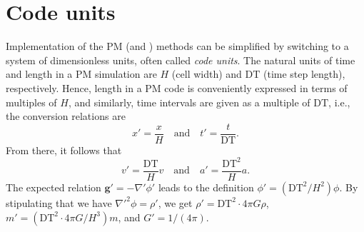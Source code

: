 \section{Code units}
Implementation of the PM (and \PThreeM{}) methods can be simplified by switching to a system of dimensionless units, often called \textit{code units}.
The natural units of time and length in a PM simulation are $H$ (cell width) and $\textrm{DT}$ (time step length), respectively.
Hence, length in a PM code is conveniently expressed in terms of multiples of $H$, and similarly, time intervals are given as a multiple of $\textrm{DT}$, i.e., the conversion relations are
\begin{equation*}
    x' = \frac{x}{H} \quad \text{and} \quad t' = \frac{t}{\textrm{DT}}.
\end{equation*}
From there, it follows that
\begin{equation*}
    v' = \frac{\textrm{DT}}{H}v \quad \text{and} \quad a' = \frac{\textrm{DT}^2}{H}a.
\end{equation*}
The expected relation $\mathbf{g}' = -\nabla' \phi'$ leads to the definition $\phi' = (\textrm{DT}^2 / H^2)\phi$.
By stipulating that we have $\nabla'^2\phi = \rho'$, we get $\rho' = \textrm{DT}^2 \cdot 4\pi G\rho$, $m' = (\textrm{DT}^2\cdot 4\pi G / H^3) m$, and $G' = 1/(4\pi)$.

